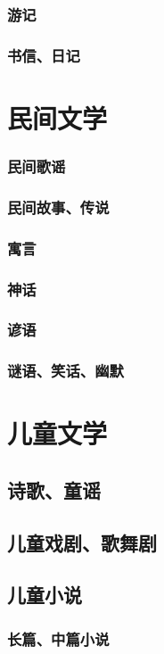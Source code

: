\documentclass[UTF8]{../../RepresentationUniverse}
\begin{document}
\subsubsection{游记}
\subsubsection{书信、日记}


\section{民间文学}
    \subsubsection{民间歌谣}
    \subsubsection{民间故事、传说}
    \subsubsection{寓言}
    \subsubsection{神话}
    \subsubsection{谚语}
    \subsubsection{谜语、笑话、幽默}



\section{儿童文学}
    \subsection{诗歌、童谣}
    \subsection{儿童戏剧、歌舞剧}
    \subsection{儿童小说}
        \subsubsection{长篇、中篇小说}
\end{document}
